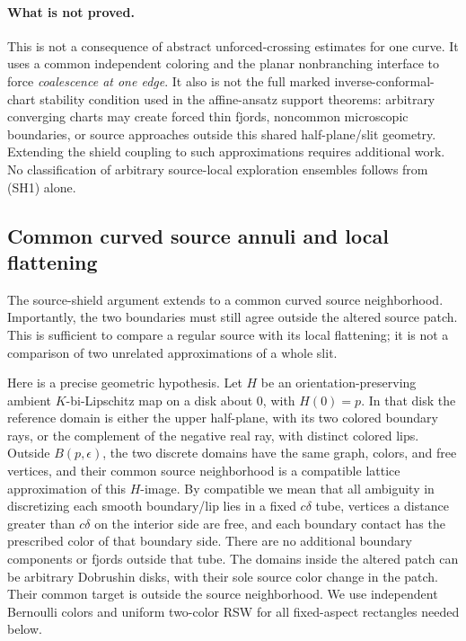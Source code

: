 \documentclass[11pt]{article}
\theoremstyle{definition}\newtheorem{definition}[theorem]{Definition}
\theoremstyle{remark}\newtheorem{remark}[theorem]{Remark}
\begin{document}
\paragraph{What is not proved.}
This is not a consequence of abstract unforced-crossing estimates for one
curve. It uses a common independent coloring and the planar nonbranching
interface to force \emph{coalescence at one edge}. It also is not the full
marked inverse-conformal-chart stability condition used in the affine-ansatz
support theorems: arbitrary converging charts may create forced thin fjords,
noncommon microscopic boundaries, or source approaches outside this shared
half-plane/slit geometry. Extending the shield coupling to such approximations
requires additional work. No classification of arbitrary source-local
exploration ensembles follows from (SH1) alone.

\subsection{Common curved source annuli and local flattening}
\label{sec:ss-curved}

The source-shield argument extends to a common curved source neighborhood.
Importantly, the two boundaries must still agree outside the altered source
patch. This is sufficient to compare a regular source with its local
flattening; it is not a comparison of two unrelated approximations of a
whole slit.

Here is a precise geometric hypothesis. Let $H$ be an orientation-preserving
ambient $K$-bi-Lipschitz map on a disk about $0$, with $H(0)=p$. In that disk
the reference domain is either the upper half-plane, with its two colored
boundary rays, or the complement of the negative real ray, with distinct
colored lips. Outside $B(p,\epsilon)$, the two discrete domains have the
same graph, colors, and free vertices, and their common source neighborhood
is a compatible lattice approximation of this $H$-image. By compatible we
mean that all ambiguity in discretizing each smooth boundary/lip lies in
a fixed $c\delta$ tube, vertices a distance greater than $c\delta$ on the
interior side are free, and each boundary contact has the prescribed color
of that boundary side. There are no additional boundary components or
fjords outside that tube. The domains inside the altered patch can be
arbitrary Dobrushin disks, with their sole source color change in the
patch. Their common target is outside the source neighborhood. We use
independent Bernoulli colors and uniform two-color RSW for all
fixed-aspect rectangles needed below.
\end{document}
